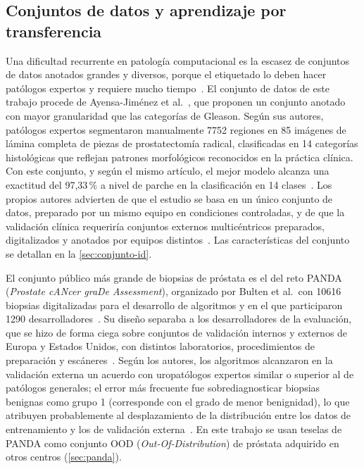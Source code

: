 \subsection{Conjuntos de datos y aprendizaje por transferencia}\label{sec:ea-datos-transferencia}

Una dificultad recurrente en patología computacional es la escasez de conjuntos
de datos anotados grandes y diversos, porque el etiquetado lo deben hacer
patólogos expertos y requiere mucho tiempo~\cite{ayensa2026}. El conjunto de datos
de este trabajo procede de Ayensa-Jiménez et al.~\cite{ayensa2026}, que
proponen un conjunto anotado con mayor granularidad que las categorías de
Gleason. Según sus autores, patólogos expertos segmentaron manualmente
\num{7752} regiones en 85 imágenes de lámina completa de piezas de
prostatectomía radical, clasificadas en 14 categorías histológicas que reflejan
patrones morfológicos reconocidos en la práctica clínica. Con este conjunto, y
según el mismo artículo, el mejor modelo alcanza una exactitud del 97,33\,\% a
nivel de parche en la clasificación en 14 clases~\cite{ayensa2026}. Los propios
autores advierten de que el estudio se basa en un único conjunto de datos,
preparado por un mismo equipo en condiciones controladas, y de que la validación
clínica requeriría conjuntos externos multicéntricos preparados, digitalizados y
anotados por equipos distintos~\cite{ayensa2026}. Las características del
conjunto se detallan en la \cref{sec:conjunto-id}.

El conjunto público más grande de biopsias de próstata es el del reto PANDA
(\emph{Prostate cANcer graDe Assessment}), organizado por Bulten et al.\ con
\num{10616} biopsias digitalizadas para el desarrollo de algoritmos y en el que
participaron \num{1290} desarrolladores~\cite{bulten2022}. Su diseño separaba a
los desarrolladores de la evaluación, que se hizo de forma ciega sobre conjuntos
de validación internos y externos de Europa y Estados Unidos, con distintos
laboratorios, procedimientos de preparación y escáneres~\cite{bulten2022}. Según
los autores, los algoritmos alcanzaron en la validación externa un acuerdo con
uropatólogos expertos similar o superior al de patólogos generales; el error más
frecuente fue sobrediagnosticar biopsias benignas como grupo 1 (corresponde con el grado de menor benignidad), lo que atribuyen
probablemente al desplazamiento de la distribución entre los datos de
entrenamiento y los de validación externa~\cite{bulten2022}. En este trabajo se
usan teselas de PANDA como conjunto OOD (\textit{Out-Of-Distribution}) de próstata adquirido en otros centros
(\cref{sec:panda}).

